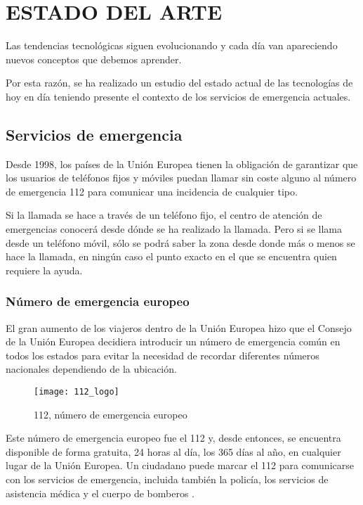 \chapter{ESTADO DEL ARTE\label{sec:estado_del_arte}}

\clearpage

Las tendencias tecnológicas siguen evolucionando y cada día van apareciendo nuevos conceptos que debemos aprender.

Por esta razón, se ha realizado un estudio del estado actual de las tecnologías de hoy en día teniendo presente el contexto de los servicios de emergencia actuales.

\section{Servicios de emergencia}

Desde 1998, los países de la Unión Europea tienen la obligación de garantizar que los usuarios de teléfonos fijos y móviles puedan llamar sin coste alguno al número de emergencia 112 para comunicar una incidencia de cualquier tipo.

Si la llamada se hace a través de un teléfono fijo, el centro de atención de emergencias conocerá desde dónde se ha realizado la llamada. Pero si se llama desde un teléfono móvil, sólo se podrá saber la zona desde donde más o menos se hace la llamada, en ningún caso el punto exacto en el que se encuentra quien requiere la ayuda.

\subsection{Número de emergencia europeo}

El gran aumento de los viajeros dentro de la Unión Europea hizo que el Consejo de la Unión Europea decidiera introducir un número de emergencia común en todos los estados para evitar la necesidad de recordar diferentes números nacionales dependiendo de la ubicación.

\begin{figure}[htp!]
  \centering
  \texttt{[image: 112\_logo]}
  \caption{112, número de emergencia europeo}
  \label{fig:112_logo}
\end{figure}

Este número de emergencia europeo fue el 112 y, desde entonces, se encuentra disponible de forma gratuita, 24 horas al día, los 365 días al año, en cualquier lugar de la Unión Europea. Un ciudadano puede marcar el 112 para comunicarse con los servicios de emergencia, incluida también la policía, los servicios de asistencia médica y el cuerpo de bomberos \cite{eena2}.

